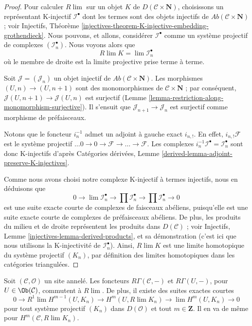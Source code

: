 \begin{proof}
Pour calculer $R\lim$ sur un objet $K$ de
$D(\mathcal{C} \times \mathbf{N})$, choisissons un représentant K-injectif
$\mathcal{I}^\bullet$ dont les termes sont des objets injectifs de
$\textit{Ab}(\mathcal{C} \times \mathbf{N})$ ; voir Injectifs, Théorème
\ref{injectives-theorem-K-injective-embedding-grothendieck}. Nous pouvons,
et allons, considérer $\mathcal{I}^\bullet$ comme un système projectif de
complexes $(\mathcal{I}_n^\bullet)$. Nous voyons alors que
$$
R\lim K = \lim \mathcal{I}_n^\bullet
$$
où le membre de droite est la limite projective prise terme à terme.

\medskip\noindent
Soit $\mathcal{J} = (\mathcal{J}_n)$ un objet injectif de
$\textit{Ab}(\mathcal{C} \times \mathbf{N})$. Les morphismes
$(U, n) \to (U, n + 1)$ sont des monomorphismes de
$\mathcal{C} \times \mathbf{N}$ ; par conséquent,
$\mathcal{J}(U, n + 1) \to \mathcal{J}(U, n)$ est surjectif (Lemme
\ref{lemma-restriction-along-monomorphism-surjective}). Il s'ensuit que
$\mathcal{J}_{n + 1} \to \mathcal{J}_n$ est surjectif comme morphisme de
préfaisceaux.

\medskip\noindent
Notons que le foncteur $i_n^{-1}$ admet un adjoint à gauche exact
$i_{n, !}$. En effet, $i_{n, !}\mathcal{F}$ est le système projectif
$\ldots 0 \to 0 \to \mathcal{F} \to \ldots \to \mathcal{F}$. Les
complexes $i_n^{-1}\mathcal{I}^\bullet = \mathcal{I}_n^\bullet$ sont donc
K-injectifs d'après Catégories dérivées, Lemme
\ref{derived-lemma-adjoint-preserve-K-injectives}.

\medskip\noindent
Comme nous avons choisi notre complexe K-injectif à termes injectifs, nous
en déduisons que
$$
0 \to  \lim \mathcal{I}_n^\bullet \to \prod \mathcal{I}_n^\bullet
\to \prod \mathcal{I}_n^\bullet \to 0
$$
est une suite exacte courte de complexes de faisceaux abéliens, puisqu'elle
est une suite exacte courte de complexes de préfaisceaux abéliens. De plus,
les produits du milieu et de droite représentent les produits dans
$D(\mathcal{C})$ ; voir Injectifs, Lemme
\ref{injectives-lemma-derived-products}, et sa démonstration (c'est ici que
nous utilisons la K-injectivité de $\mathcal{I}_n^\bullet$). Ainsi,
$R\lim K$ est une limite homotopique du système projectif $(K_n)$, par
définition des limites homotopiques dans les catégories triangulées.
\end{proof}

\begin{lemma}
\label{lemma-RGamma-commutes-with-Rlim}
Soit $(\mathcal{C}, \mathcal{O})$ un site annelé. Les foncteurs
$R\Gamma(\mathcal{C}, -)$ et $R\Gamma(U, -)$, pour
$U \in \Ob(\mathcal{C})$, commutent à $R\lim$. De plus, il existe des
suites exactes courtes
$$
0 \to
R^1\lim H^{m - 1}(U, K_n) \to H^m(U, R\lim K_n) \to
\lim H^m(U, K_n) \to 0
$$
pour tout système projectif $(K_n)$ dans $D(\mathcal{O})$ et tout
$m \in \mathbf{Z}$. Il en va de même pour
$H^m(\mathcal{C}, R\lim K_n)$.
\end{lemma}

